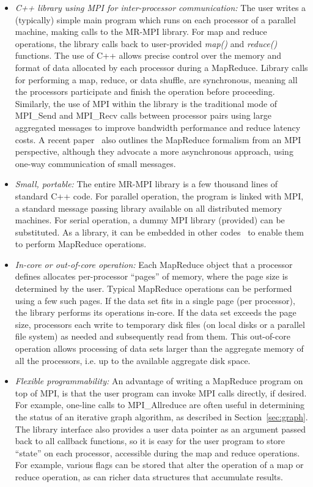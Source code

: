 \begin{itemize}

\item {\it C++ library using MPI for inter-processor communication:}
The user writes a (typically) simple main program which runs on each
processor of a parallel machine, making calls to the MR-MPI library.
For map and reduce operations, the library calls back to user-provided
{\it map()} and {\it reduce()} functions.  The use of C++ allows precise control
over the memory and format of data allocated by each processor during
a MapReduce.  Library calls for performing a map, reduce, or data
shuffle, are synchronous, meaning all the processors participate and
finish the operation before proceeding.  Similarly, the use of MPI
within the library is the traditional mode of MPI\_Send and
MPI\_Recv calls between processor pairs using large aggregated
messages to improve bandwidth performance and reduce latency costs.  A
recent paper~\cite{Hoefler09} also outlines the MapReduce formalism
from an MPI perspective, although they advocate a more asynchronous
approach, using one-way communication of small messages.

\item {\it Small, portable:} The entire MR-MPI library is a few thousand
lines of standard C++ code.  For parallel operation, the program is
linked with MPI, a standard message passing library available on all
distributed memory machines.  For serial operation, a dummy MPI
library (provided) can be substituted.  As a library, it can be
embedded in other codes~\cite{Titan} to enable them to
perform MapReduce operations.

\item {\it In-core or out-of-core operation:} Each MapReduce object that a
processor defines allocates per-processor ``pages'' of memory, where
the page size is determined by the user.  Typical MapReduce operations
can be performed using a few such pages.  If the data set fits in a
single page (per processor), the library performs its operations
in-core.  If the data set exceeds the page size, processors each
write to temporary disk files (on local disks or a parallel file
system) as needed and subsequently read from them.  This out-of-core
operation allows
processing of data sets larger than the aggregate memory of all the
processors, i.e. up to the available aggregate disk space.

\item {\it Flexible programmability:} An advantage of writing a
MapReduce program on top of MPI, is that the user program can invoke
MPI calls directly, if desired.  For example, one-line calls to
MPI\_Allreduce are often useful in determining the status of an
iterative graph algorithm, as described in Section~\ref{sec:graph}.
The library interface also provides a user data pointer as an argument
passed back to all callback functions, so it is easy for the user
program to store ``state'' on each processor, accessible during the
map and reduce operations.  For example, various flags can be stored
that alter the operation of a map or reduce operation, as can richer
data structures that accumulate results.


\end{itemize}
